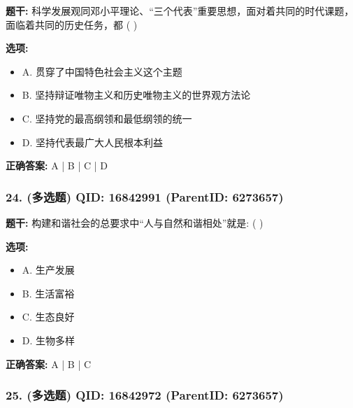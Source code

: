 \documentclass[12pt,UTF8]{ctexart}
\begin{document}
\textbf{题干:}
科学发展观同邓小平理论、“三个代表”重要思想，面对着共同的时代课题，面临着共同的历史任务，都 ( )



\textbf{选项:}
\begin{itemize}[leftmargin=*]

  \item A. 贯穿了中国特色社会主义这个主题

  \item B. 坚持辩证唯物主义和历史唯物主义的世界观方法论

  \item C. 坚持党的最高纲领和最低纲领的统一

  \item D. 坚持代表最广大人民根本利益

\end{itemize}

\textbf{正确答案:}
A | B | C | D

\vspace{0.3em}\hrulefill\vspace{0.7em}

\subsubsection*{24. (多选题) \small QID: 16842991 (ParentID: 6273657)}

\textbf{题干:}
构建和谐社会的总要求中“人与自然和谐相处”就是: ( )



\textbf{选项:}
\begin{itemize}[leftmargin=*]

  \item A. 生产发展

  \item B. 生活富裕

  \item C. 生态良好

  \item D. 生物多样

\end{itemize}

\textbf{正确答案:}
A | B | C

\vspace{0.3em}\hrulefill\vspace{0.7em}

\subsubsection*{25. (多选题) \small QID: 16842972 (ParentID: 6273657)}
\end{document}
